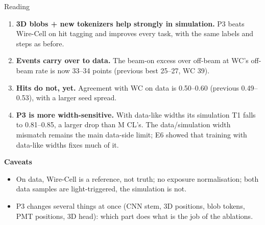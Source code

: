 \documentclass[aspectratio=169,10pt]{beamer}
\begin{document}
\begin{frame}{Reading}
  \footnotesize
  \begin{enumerate}\setlength{\itemsep}{6pt}
    \item \textbf{3D blobs + new tokenizers help strongly in simulation.} P3 beats Wire-Cell on hit tagging and improves every task, with the
      same labels and steps as before.
    \item \textbf{Events carry over to data.} The beam-on excess over off-beam at WC's off-beam rate is now 33--34 points (previous best 25--27,
      WC 39).
    \item \textbf{Hits do not, yet.} Agreement with WC on data is 0.50--0.60 (previous 0.49--0.53), with a larger seed spread.
    \item \textbf{P3 is more width-sensitive.} With data-like widths its simulation T1 falls to 0.81--0.85, a larger drop than M CL's. The
      data/simulation width mismatch remains the main data-side limit; E6 showed that training with data-like widths fixes much of it.
  \end{enumerate}
  \vspace{4pt}
  \textbf{Caveats}
  \begin{itemize}\setlength{\itemsep}{2pt}\scriptsize
    \item On data, Wire-Cell is a reference, not truth; no exposure normalisation; both data samples are light-triggered, the simulation is not.
    \item P3 changes several things at once (CNN stem, 3D positions, blob tokens, PMT positions, 3D head): which part does what is the job of
      the ablations.
  \end{itemize}
\end{frame}

\end{document}
